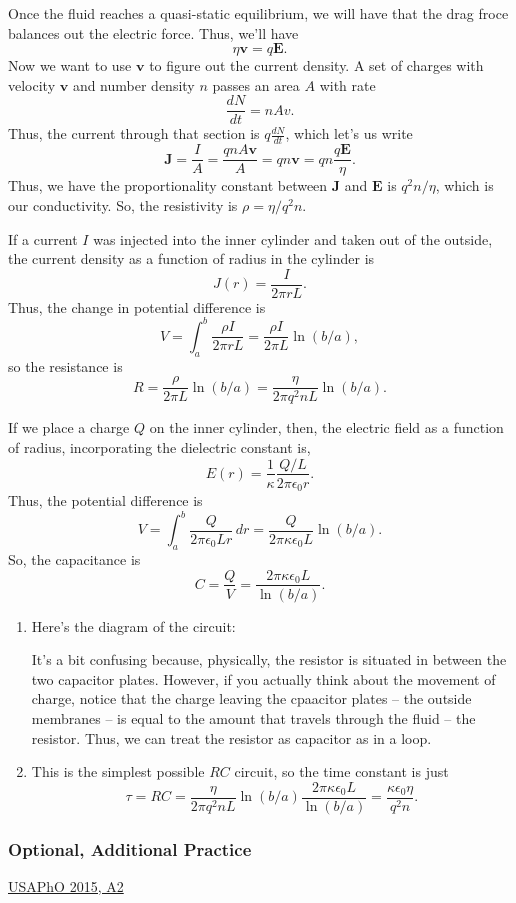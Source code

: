 \documentclass[11pt]{scrartcl}
\begin{document}
\begin{alphasol}
    \item Once the fluid reaches a quasi-static equilibrium, we will have that the drag froce balances out the electric force. Thus, we'll have
    $$\eta \mathbf v = q \mathbf E.$$
    Now we want to use $\mathbf v$ to figure out the current density. A set of charges with velocity $\mathbf v$ and number density $n$ passes an area $A$ with rate
    $$\frac{dN}{dt} = nAv.$$
    Thus, the current through that section is $q \frac{dN}{dt}$, which let's us write
    $$\mathbf J = \frac{I}{A} = \frac{qnA\mathbf v}{A} = qn\mathbf v = q n \frac{q\mathbf E}{\eta}.$$
    Thus, we have the proportionality constant between $\mathbf J$ and $\mathbf E$ is $q^2 n/\eta$, which is our conductivity. So, the resistivity is $\boxed{\rho = \eta / q^2n}$.
    \item If a current $I$ was injected into the inner cylinder and taken out of the outside, the current density as a function of radius in the cylinder is
    $$J(r) = \frac{I}{2\pi r L}.$$
    Thus, the change in potential difference is
    $$V = \int_a^b \frac{\rho I}{2\pi r L} = \frac{\rho I}{2\pi L}\ln(b/a),$$
    so the resistance is
    $$R = \frac{\rho}{2\pi L} \ln (b/a) = \frac{\eta }{2\pi q^2 n L}\ln (b/a).$$
    \item If we place a charge $Q$ on the inner cylinder, then, the electric field as a function of radius, incorporating the dielectric constant is,
    $$E(r) = \frac 1\kappa \frac{Q/L}{2\pi \epsilon_0 r}.$$
    Thus, the potential difference is
    $$V = \int_a^b \frac{Q}{2\pi \epsilon_0 L r}\, dr = \frac{ Q}{2\pi \kappa \epsilon_0 L}\ln(b/a).$$
    So, the capacitance is
    $$C = \frac{Q}{V} = \frac{2\pi \kappa \epsilon_0 L}{\ln (b/a)}.$$
    \item 
    \begin{enumerate}[label=\roman*.]
    \item Here's the diagram of the circuit:

    It's a bit confusing because, physically, the resistor is situated in between the two capacitor plates. However, if you actually think about the movement of charge, notice that the charge leaving the cpaacitor plates -- the outside membranes -- is equal to the amount that travels through the fluid -- the resistor. Thus, we can treat the resistor as capacitor as in a loop.
    \item This is the simplest possible $RC$ circuit, so the time constant is just
    $$\tau = RC = \frac{\eta }{2\pi q^2 n L}\ln (b/a)\frac{2\pi \kappa \epsilon_0 L}{\ln (b/a)} = \frac{\kappa \epsilon_0 \eta }{q^2 n}.$$
    \end{enumerate}
\end{alphasol}


\subsubsection{Optional, Additional Practice}

\begin{prob}
    \href{https://www.aapt.org/physicsteam/2015/upload/E3-2-5.pdf#page=4}{USAPhO 2015, A2}
\end{prob}
\end{document}
